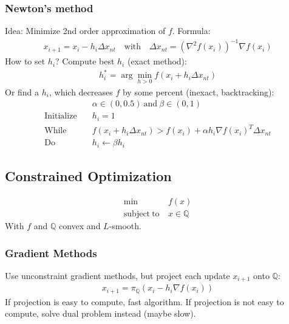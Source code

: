 \documentclass[a4paper,landscape,8pt,fleqn]{scrartcl}
\newcommand{\mb}[1]{\mathbb{#1}}
\begin{document}
\begin{multicols}{3}
\subsubsection{Newton's method}
Idea: Minimize 2nd order approximation of $f$. Formula:
\begin{align*}
	x_{i+1} = x_i - h_i \Delta x_{nt} \quad \mathrm{with \quad} \Delta x_{nt} = (\nabla^2 f(x_i))^{-1} \nabla f(x_i)
\end{align*}
How to set $h_i$? Compute best $h_i$ (exact method): 
\begin{align*}
h_i^* = \arg \min_{h>0} f(x_i+h_i \Delta x_{nt})
\end{align*}
Or find a $h_i$, which decreases $f$ by some percent (inexact, backtracking):
\begin{align*}
	& \alpha \in (0,0.5) \mathrm{~and~} \beta \in (0,1) \\
	\mathrm{Initialize} \quad& h_i = 1 \\
	\mathrm{While} \quad& f(x_i + h_i \Delta x_{nt})>f(x_i) + \alpha h_i \nabla f(x_i)^T \Delta x_{nt} \\
	\mathrm{Do} \quad& h_i \leftarrow \beta h_i
\end{align*}
\subsection{Constrained Optimization}
\begin{align*}
	\min ~&f(x) \\
	\mathrm{subject~to~}&x \in \mb{Q}
\end{align*}
With $f$ and $\mb{Q}$ convex and $L$-smooth.
\subsubsection{Gradient Methods}
Use unconstraint gradient methods, but project each update $x_{i+1}$ onto $\mb{Q}$:
\begin{align*}
	x_{i+1} = \pi_\mb{Q} ( x_i - h_i \nabla f(x_i))
\end{align*}
If projection is easy to compute, fast algorithm. If projection is not easy to compute, solve dual problem instead (maybe slow).

\end{multicols}
\end{document}
